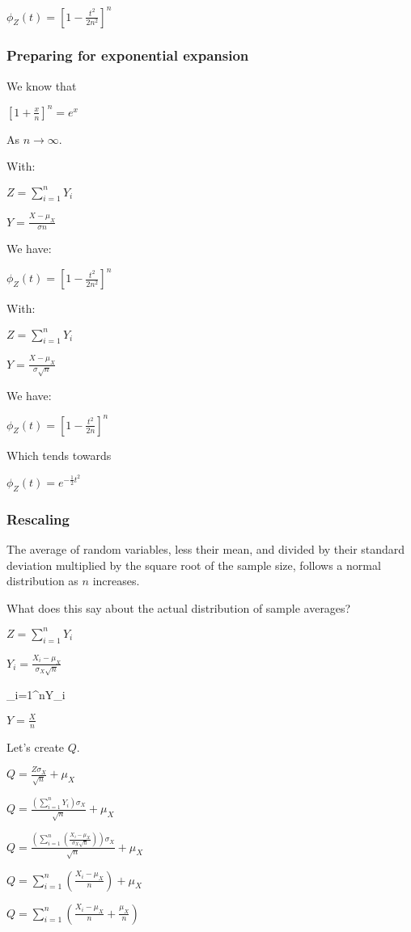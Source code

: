 $\phi_Z(t)=[1-\frac{t^2}{2n^2}]^n$

\subsubsection{Preparing for exponential expansion}

We know that

$[1+\frac{x}{n}]^n=e^x$

As \(n \rightarrow \infty\).

With:

$Z=\sum_{i=1}^nY_i$

$Y=\frac{X-\mu_X }{\sigma n}$

We have:

$\phi_Z(t)=[1-\frac{t^2}{2n^2}]^n$

With:

$Z=\sum_{i=1}^nY_i$

$Y=\frac{X-\mu_X }{\sigma \sqrt n}$

We have:

$\phi_Z(t)=[1-\frac{t^2}{2n}]^n$

Which tends towards

$\phi_Z(t)=e^{-\frac{1}{2}t^2}$

\subsubsection{Rescaling}

The average of random variables, less their mean, and divided by their standard deviation multiplied by the square root of the sample size, follows a normal distribution as \(n\) increases.

What does this say about the actual distribution of sample averages?

$Z=\sum_{i=1}^nY_i$

$Y_i=\frac{X_i-\mu_X }{\sigma_X \sqrt n}$

\sum_{i=1}^nY_i

$Y=\frac{X}{n}$

Let's create \(Q\).

$Q=\frac{Z\sigma_X }{\sqrt n}+\mu_X$

$Q=\frac{(\sum_{i=1}^nY_i)\sigma_X }{\sqrt n}+\mu_X$

$Q=\frac{(\sum_{i=1}^n(\frac{X_i-\mu_X }{\sigma_X \sqrt n}))\sigma_X }{\sqrt n}+\mu_X$

$Q=\sum_{i=1}^n(\frac{X_i-\mu_X }{n})+\mu_X$

$Q=\sum_{i=1}^n(\frac{X_i-\mu_X }{n}+\frac{\mu_X}{n})$

